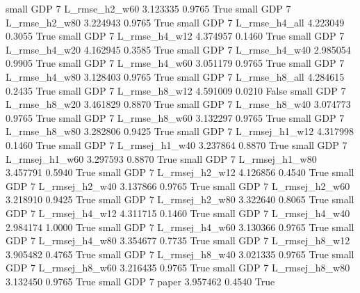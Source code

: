      small      GDP                 7  L_rmse_h2_w60   3.123335      0.9765    True
     small      GDP                 7  L_rmse_h2_w80   3.224943      0.9765    True
     small      GDP                 7  L_rmse_h4_all   4.223049      0.3055    True
     small      GDP                 7  L_rmse_h4_w12   4.374957      0.1460    True
     small      GDP                 7  L_rmse_h4_w20   4.162945      0.3585    True
     small      GDP                 7  L_rmse_h4_w40   2.985054      0.9905    True
     small      GDP                 7  L_rmse_h4_w60   3.051179      0.9765    True
     small      GDP                 7  L_rmse_h4_w80   3.128403      0.9765    True
     small      GDP                 7  L_rmse_h8_all   4.284615      0.2435    True
     small      GDP                 7  L_rmse_h8_w12   4.591009      0.0210   False
     small      GDP                 7  L_rmse_h8_w20   3.461829      0.8870    True
     small      GDP                 7  L_rmse_h8_w40   3.074773      0.9765    True
     small      GDP                 7  L_rmse_h8_w60   3.132297      0.9765    True
     small      GDP                 7  L_rmse_h8_w80   3.282806      0.9425    True
     small      GDP                 7 L_rmsej_h1_w12   4.317998      0.1460    True
     small      GDP                 7 L_rmsej_h1_w40   3.237864      0.8870    True
     small      GDP                 7 L_rmsej_h1_w60   3.297593      0.8870    True
     small      GDP                 7 L_rmsej_h1_w80   3.457791      0.5940    True
     small      GDP                 7 L_rmsej_h2_w12   4.126856      0.4540    True
     small      GDP                 7 L_rmsej_h2_w40   3.137866      0.9765    True
     small      GDP                 7 L_rmsej_h2_w60   3.218910      0.9425    True
     small      GDP                 7 L_rmsej_h2_w80   3.322640      0.8065    True
     small      GDP                 7 L_rmsej_h4_w12   4.311715      0.1460    True
     small      GDP                 7 L_rmsej_h4_w40   2.984174      1.0000    True
     small      GDP                 7 L_rmsej_h4_w60   3.130366      0.9765    True
     small      GDP                 7 L_rmsej_h4_w80   3.354677      0.7735    True
     small      GDP                 7 L_rmsej_h8_w12   3.905482      0.4765    True
     small      GDP                 7 L_rmsej_h8_w40   3.021335      0.9765    True
     small      GDP                 7 L_rmsej_h8_w60   3.216435      0.9765    True
     small      GDP                 7 L_rmsej_h8_w80   3.132450      0.9765    True
     small      GDP                 7          paper   3.957462      0.4540    True
